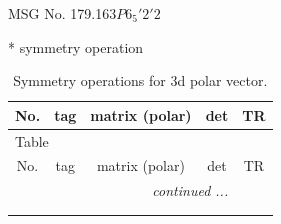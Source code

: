 \documentclass[fleqn,8pt]{jsarticle}
\begin{document}
\setcounter{MaxMatrixCols}{32}

\renewcommand{\tablename}{Table~}
\renewcommand{\figurename}{Figure~}
\begin{center}
\LARGE
MSG No. 179.163\quad$P6_{5}'2'2$
\end{center}
* symmetry operation
\renewcommand{\arraystretch}{1.3}
\begin{longtable}{ccccc}
\caption{Symmetry operations for 3d polar vector.}
 \\
 \hline \hline
No. & tag & matrix (polar) & det & TR \\ \hline \endfirsthead

\multicolumn{4}{l}{\tablename\ \thetable{}} \\
 \hline \hline
No. & tag & matrix (polar) & det & TR \\ \hline \endhead

 \hline \hline
\multicolumn{4}{r}{\footnotesize\it continued ...} \\ \endfoot

 \hline \hline
\multicolumn{4}{r}{} \\ \endlastfoot


\end{longtable}
\end{document}
